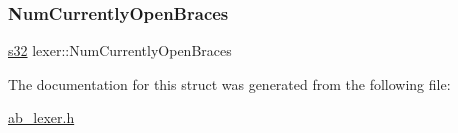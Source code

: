 \subsubsection{\texorpdfstring{Num\+Currently\+Open\+Braces}{NumCurrentlyOpenBraces}}
{\footnotesize\ttfamily \hyperlink{ab__common_8h_ae9b1af5c037e57a98884758875d3a7c4}{s32} lexer\+::\+Num\+Currently\+Open\+Braces}



The documentation for this struct was generated from the following file\+:\begin{DoxyCompactItemize}
\item 
\hyperlink{ab__lexer_8h}{ab\+\_\+lexer.\+h}\end{DoxyCompactItemize}

